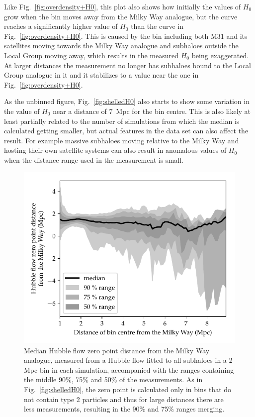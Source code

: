 \documentclass[english, twoside]{HYgradu}
\begin{document}
Like Fig.~\ref{fig:overdensity+H0}, this plot also shows how initially the values of $H_0$ grow when the bin moves away from the Milky Way analogue, but the curve reaches a significantly higher value of $H_0$ than the curve in Fig.~\ref{fig:overdensity+H0}. This is caused by the bin including both M31 and its satellites moving towards the Milky Way analogue and subhaloes outside the Local Group moving away, which results in the measured $H_0$ being exaggerated. At larger distances the measurement no longer has subhaloes bound to the Local Group analogue in it and it stabilizes to a value near the one in Fig.~\ref{fig:overdensity+H0}.

As the unbinned figure, Fig.~\ref{fig:shelledH0} also starts to show some variation in the value of $H_0$ near a distance of 7~Mpc for the bin centre. This is also likely at least partially related to the number of simulations from which the median is calculated getting smaller, but actual features in the data set can also affect the result. For example massive subhaloes moving relative to the Milky Way and hosting their own satellite systems can also result in anomalous values of $H_0$ when the distance range used in the measurement is small.

\begin{figure}
    \centering
    \includegraphics{kuvat/zeros.pdf}
    \caption{Median Hubble flow zero point distance from the Milky Way analogue, measured from a Hubble flow fitted to all subhaloes in a 2 Mpc bin in each simulation, accompanied with the ranges containing the middle 90\%, 75\% and 50\% of the measurements. As in Fig.~\ref{fig:shelledH0}, the zero point is calculated only in bins that do not contain type 2 particles and thus for large distances there are less measurements, resulting in the 90\% and 75\% ranges merging.}\label{fig:shelledZeros}
\end{figure}
\end{document}
